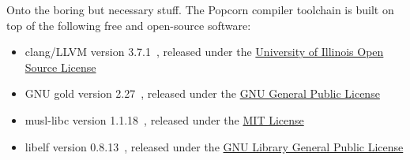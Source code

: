 \documentclass{article}
\begin{document}
Onto the boring but necessary stuff.  The Popcorn compiler toolchain is built on top of the following free and open-source software:

\begin{itemize}
	\item clang/LLVM version 3.7.1~\cite{1281665}, released under the \href{http://releases.llvm.org/4.0.0/LICENSE.TXT}{University of Illinois Open Source License}
	\item GNU gold version 2.27~\cite{binutils}, released under the \href{https://www.gnu.org/licenses/gpl.html}{GNU General Public License}
	\item musl-libc version 1.1.18~\cite{musl-libc}, released under the \href{http://git.musl-libc.org/cgit/musl/tree/COPYRIGHT}{MIT License}
	\item libelf version 0.8.13~\cite{libelf}, released under the \href{http://www.mr511.de/software/COPYING.LIB-2.0}{GNU Library General Public License}
\end{itemize}

\end{document}
